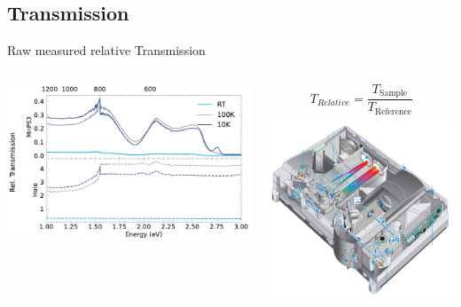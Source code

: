 \documentclass[
	10pt,
]{beamer}
\newcommand{\customcite}[1]{
	\scriptsize\raggedright\fullcite{#1}
}
\begin{document}
\subsection{Transmission}
\begin{frame}{Raw measured relative Transmission}
	\begin{columns}
		\centering
		\includegraphics[width=\textwidth]{../figures/2024-03-15 MnPS3 transmission raw.pdf}
		
		$$T_{Relative} = \frac{T_\text{Sample}}{T_\text{Reference}}$$
		\includegraphics[width=\textwidth]{../figures/carray schematic.png}\\
		\customcite{cary}
	\end{columns}
\end{frame}
\end{document}
